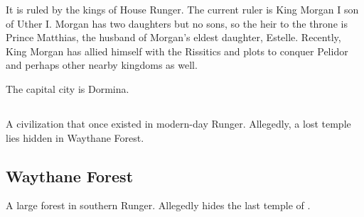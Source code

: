 
It is ruled by the kings of House Runger. The current ruler is King Morgan I son of Uther I. Morgan has two daughters but no sons, so the heir to the throne is Prince Matthias, the husband of Morgan's eldest daughter, Estelle. Recently, King Morgan has allied himself with the Rissitics and plots to conquer Pelidor and perhaps other nearby kingdoms as well. 

The capital city is Dormina. 









\subsection{\EreshKal}
\label{\EreshKal}
\index{\EreshKal}
A \meccaran{} civilization that once existed in modern-day Runger. Allegedly, a lost \EreshKali{} temple lies hidden in Waythane Forest. 









\subsection{Waythane Forest}
A large forest in southern Runger. Allegedly hides the last temple of \hs{\EreshKal}. 















